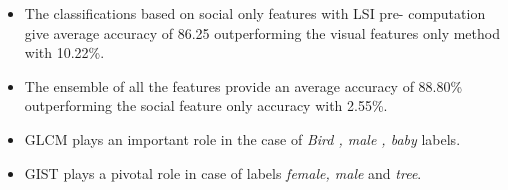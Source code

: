 \begin{itemize}
\item The classifications based on social only features with LSI pre-
computation give average accuracy of 86.25 outperforming the visual 
features only method with 10.22\%.

\item The ensemble of all the features provide an average accuracy of 
88.80\% outperforming the social feature only accuracy with 2.55\%.

\item GLCM plays an important role in the case of \textit{Bird , male , baby}  labels.

\item GIST plays a pivotal role in case of labels \textit{female, male} and \textit{tree}.
\end{itemize}



